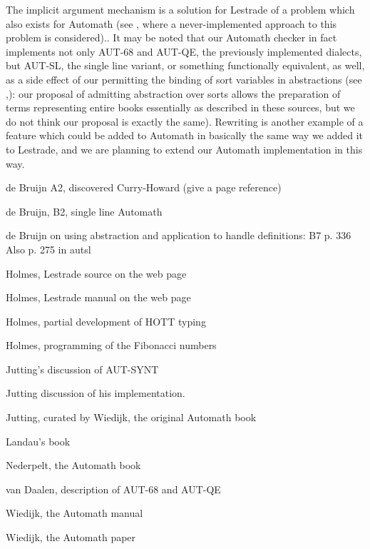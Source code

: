 \documentclass{article}
\begin{document}
The implicit argument mechanism is a solution for Lestrade of a problem which also exists for Automath (see \cite{autsynt}, where a never-implemented approach to this problem is considered)..  It may be noted that our Automath checker in fact implements not only AUT-68 and AUT-QE, the previously implemented dialects, but AUT-SL, the single line variant, or something functionally equivalent, as well, as a side effect of our permitting the binding of sort variables in abstractions (see \cite{autsl},\cite{autlambda}):   our proposal of admitting abstraction over sorts allows the preparation of terms representing entire books essentially as described in these sources, but we do not think our proposal is exactly the same).  Rewriting is another example of a feature which could be added to Automath in basically the same way we added it to Lestrade, and we are planning to extend our Automath implementation in this way.

\begin{thebibliography}{99}

 de Bruijn A2, discovered Curry-Howard (give a page reference)

   de Bruijn, B2, single line Automath

  de Bruijn on using abstraction and application to handle definitions:  B7 p. 336  Also p. 275 in autsl

  Holmes, Lestrade source on the web page

 Holmes, Lestrade manual on the web page

 Holmes, partial development of HOTT typing

  Holmes, programming of the Fibonacci numbers

  Jutting's discussion of AUT-SYNT

  Jutting discussion of his implementation.

  Jutting, curated by Wiedijk, the original Automath book

  Landau's book

  Nederpelt, the Automath book

  van Daalen, description of AUT-68 and AUT-QE

 Wiedijk, the Automath manual

  Wiedijk, the Automath paper

\end{thebibliography}
\end{document}
